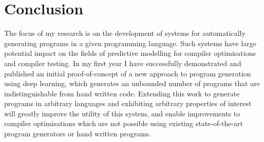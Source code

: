 \section{Conclusion}

The focus of my research is on the development of systems for automatically generating programs in a given programming language. Such systems have large potential impact on the fields of predictive modelling for compiler optimisations and compiler testing. In my first year I have successfully demonstrated and published an initial proof-of-concept of a new approach to program generation using deep learning, which generates an unbounded number of programs that are indistinguishable from hand written code. Extending this work to generate programs in arbitrary languages and exhibiting arbitrary properties of interest will greatly improve the utility of this system, and enable improvements to compiler optimisations which are not possible using existing state-of-the-art program generators or hand written programs.

